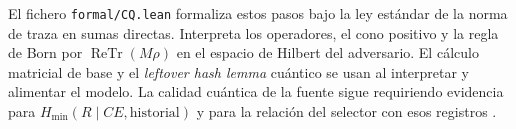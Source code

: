 El fichero \texttt{formal/CQ.lean} formaliza estos pasos bajo la ley estándar
de la norma de traza en sumas directas. Interpreta los operadores, el cono
positivo y la regla de Born por \(\operatorname{ReTr}(M\rho)\) en el espacio
de Hilbert del adversario. El cálculo matricial de base y el \emph{leftover
hash lemma} cuántico se usan al interpretar y alimentar el modelo. La calidad
cuántica de la fuente sigue requiriendo evidencia para
\(H_{\min}(R\mid CE,\text{historial})\) y para la relación del selector con
esos registros \cite{lhl}.
